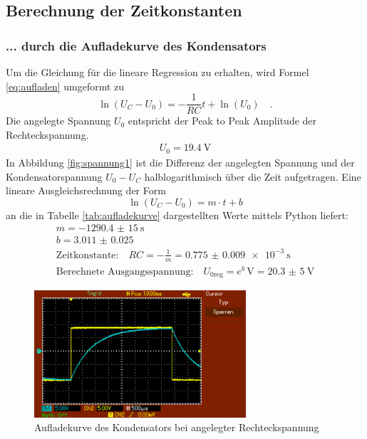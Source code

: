 
\subsection{Berechnung der Zeitkonstanten}
\subsubsection{... durch die Aufladekurve des Kondensators}
Um die Gleichung für die lineare Regression zu erhalten, wird Formel \eqref{eq:aufladen} umgeformt zu
\begin{equation}
\ln(U_C - U_0) = -\frac{1}{RC} t + \ln(U_0) \quad .
\end{equation}
Die angelegte Spannung $U_0$ entspricht der Peak to Peak Amplitude der Rechteckspannung.
\begin{align*}
	U_0 = \SI{19.4}{\volt}
\end{align*}
In Abbildung \ref{fig:spannung1} ist die Differenz der angelegten Spannung und der Kondensatorspannung $U_0 - U_C$ halblogarithmisch über die Zeit aufgetragen. Eine lineare Ausgleichsrechnung der Form
\begin{equation}
\ln(U_C - U_0) = m \cdot t + b
\end{equation} an die in Tabelle \ref{tab:aufladekurve} dargestellten Werte mittels Python liefert:
\begin{align}
	m = \SI{-1290.4(150)}{\second} \\
	b = \num{3.011(25)} \\
	\text{Zeitkonstante:} \quad RC = - \frac{1}{m} = \SI{0.775(9)e-3}{\second} \\
	\text{Berechnete Ausgangsspannung:} \quad U_{0\text{reg}} = e ^b \, \si{\volt} = \SI{20,3(5)}{\volt}
\end{align}


	
	
	
	
	

\begin{figure}[h!]
	\centering
	\includegraphics[width=0.7\textwidth]{aufladekurve.png}
	\caption{Aufladekurve des Kondensators bei angelegter Rechteckspannung}
	\label{fig:aufladekurve}
\end{figure} 

